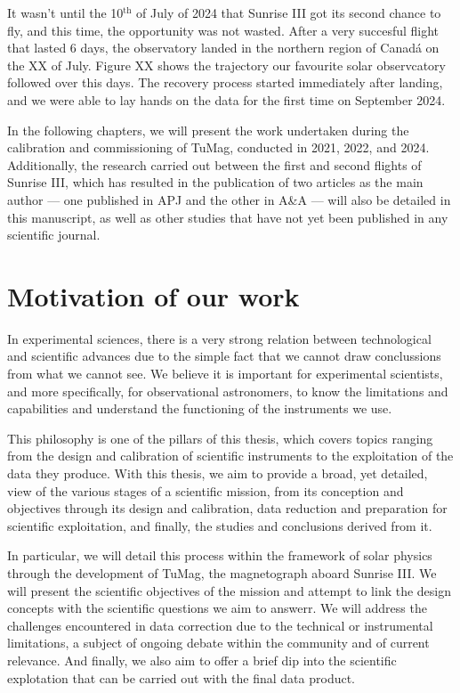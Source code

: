 It wasn't until the 10$^{\text{th}}$ of July of 2024 that Sunrise III got its second chance to fly, and this time, the opportunity was not wasted. After a very succesful flight that lasted 6 days, the observatory landed in the northern region of Canadá on the XX of July. Figure XX shows the trajectory our favourite solar observcatory followed over this days. The recovery process started immediately after landing, and we were able to lay hands on the data for the first time on September 2024. 

In the following chapters, we will present the work undertaken during the calibration and commissioning of TuMag, conducted in 2021, 2022, and 2024. Additionally, the research carried out between the first and second flights of Sunrise III, which has resulted in the publication of two articles as the main author — one published in APJ and the other in A\&A — will also be detailed in this manuscript, as well as other studies that have not yet been published in any scientific journal. 


\section{Motivation of our work}

In experimental sciences, there is a very strong relation between technological and scientific advances due to the simple fact that we cannot draw conclussions from what we cannot see. We believe it is important for experimental scientists, and more specifically, for observational astronomers, to know the limitations and capabilities and understand the functioning of the instruments we use. 

This philosophy is one of the pillars of this thesis, which covers topics ranging from the design and calibration of scientific instruments to the exploitation of the data they produce. With this thesis, we aim to provide a broad, yet detailed, view of the various stages of a scientific mission, from its conception and objectives through its design and calibration, data reduction and preparation for scientific exploitation, and finally, the studies and conclusions derived from it.

In particular, we will detail this process within the framework of solar physics through the development of TuMag, the magnetograph aboard Sunrise III. We will present the scientific objectives of the mission and attempt to link the design concepts with the scientific questions we aim to answerr. We will address the challenges encountered in data correction due to the technical or instrumental limitations, a subject of ongoing debate within the community and of current relevance. And finally, we also aim to offer a brief dip into the scientific explotation that can be carried out with the final data product. 

